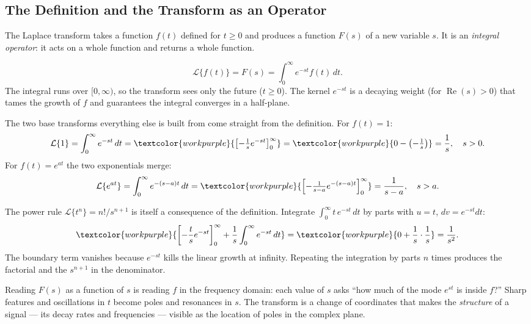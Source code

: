 \subsection{The Definition and the Transform as an Operator}

The Laplace transform takes a function $f(t)$ defined for $t \ge 0$ and produces a
function $F(s)$ of a new variable $s$. It is an \emph{integral operator}: it acts on
a whole function and returns a whole function.

\begin{formulabox}
\[ \mathcal{L}\{f(t)\} = F(s) = \int_{0}^{\infty} e^{-st} f(t)\,dt. \]
The integral runs over $[0,\infty)$, so the transform sees only the future
($t \ge 0$). The kernel $e^{-st}$ is a decaying weight (for $\operatorname{Re}(s)>0$)
that tames the growth of $f$ and guarantees the integral converges in a half-plane.
\end{formulabox}

The two base transforms everything else is built from come straight from the
definition. For $f(t)=1$:
\[ \mathcal{L}\{1\} = \int_{0}^{\infty} e^{-st}\,dt
   = \textcolor{workpurple}{\left[ -\tfrac{1}{s} e^{-st} \right]_{0}^{\infty}}
   = \textcolor{workpurple}{0 - \left(-\tfrac{1}{s}\right)} = \frac{1}{s}, \quad s>0. \]
For $f(t)=e^{at}$ the two exponentials merge:
\[ \mathcal{L}\{e^{at}\} = \int_{0}^{\infty} e^{-(s-a)t}\,dt
   = \textcolor{workpurple}{\left[ -\tfrac{1}{s-a} e^{-(s-a)t} \right]_{0}^{\infty}}
   = \frac{1}{s-a}, \quad s>a. \]

\begin{examplebox}
The power rule $\mathcal{L}\{t^n\}=n!/s^{n+1}$ is itself a consequence of the
definition. Integrate $\int_0^\infty t\,e^{-st}\,dt$ by parts with $u=t$,
$dv=e^{-st}dt$:
\[ \textcolor{workpurple}{\left[ -\frac{t}{s}e^{-st}\right]_0^\infty
   + \frac{1}{s}\int_0^\infty e^{-st}\,dt}
   = \textcolor{workpurple}{0 + \frac{1}{s}\cdot\frac{1}{s}} = \frac{1}{s^2}. \]
The boundary term vanishes because $e^{-st}$ kills the linear growth at infinity.
Repeating the integration by parts $n$ times produces the factorial and the
$s^{n+1}$ in the denominator.
\end{examplebox}

\begin{conceptbox}
Reading $F(s)$ as a function of $s$ is reading $f$ in the
\textcolor{accentorange}{frequency domain}: each value of $s$ asks ``how much of the
mode $e^{st}$ is inside $f$?'' Sharp features and oscillations in $t$ become poles
and resonances in $s$. The transform is a change of coordinates that makes the
\emph{structure} of a signal --- its decay rates and frequencies --- visible as the
\textcolor{accentorange}{location of poles} in the complex plane.
\end{conceptbox}


